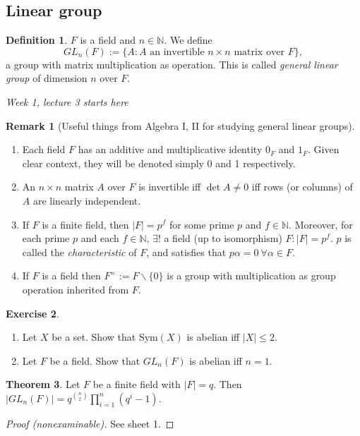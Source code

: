 \documentclass[a4paper]{article}
\newcommand{\Sym}{\text{Sym}}
\theoremstyle{definition}
\newtheorem{defn}{Definition}[subsection]
\newtheorem{thm}[defn]{Theorem}
\newtheorem{exe}[defn]{Exercise}
\newtheorem*{remark}{Remark}
\begin{document}
\subsection{Linear group}
\begin{defn}
$F$ is a field and $n\in \mathbb N$. We define
\[
GL_n(F) := \{A:A\text{ an invertible }n\times n \text{ matrix over } F\},
\]
a group with matrix multiplication as operation. This is called \textit{general linear group} of dimension $n$ over $F$.
\end{defn}
\begin{flushright}
\textit{Week 1, lecture 3 starts here}
\end{flushright}

\begin{remark}[Useful things from Algebra I, II for studying general linear groups]
\begin{enumerate}
\item Each field $F$ has an additive and multiplicative identity $0_F$ and $1_F$. Given clear context, they will be denoted simply 0 and 1 respectively.
\item An $n\times n$ matrix $A$ over $F$ is invertible iff $\det A\neq 0$ iff rows (or columns) of $A$ are linearly independent.
\item If $F$ is a finite field, then $|F|=p^f$ for some prime $p$ and $f\in\mathbb N$. Moreover, for each prime $p$ and each $f\in\mathbb N$, $\exists!$ a field (up to isomorphism) $F:|F|=p^f$. $p$ is called the \textit{characteristic} of $F$, and satisfies that $p\alpha=0 \ \forall \alpha\in F$.
\item If $F$ is a field then $F^{\times}:=F\backslash \{0\}$ is a group with multiplication as group operation inherited from $F$.
\end{enumerate}
\end{remark}
\begin{exe}
\begin{enumerate}
\item Let $X$ be a set. Show that $\Sym(X)$ is abelian iff $|X|\leq 2$.
\item Let $F$ be a field. Show that $GL_n(F)$ is abelian iff $n=1$.
\end{enumerate}
\end{exe}
\begin{thm}
\label{thm:orderofGLnF}
Let $F$ be a finite field with $|F|=q$. Then $\displaystyle |GL_n(F)|=q^{\binom{n}{2}} \prod_{i=1}^n (q^i-1)$.
\end{thm}
\begin{proof}[Proof (nonexaminable)]
See sheet 1. 
\end{proof}
\end{document}
